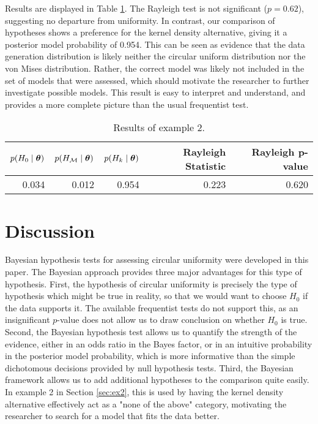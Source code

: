 Results are displayed in Table \ref{tab:ex2}. The Rayleigh test is not significant (\( p = 0.62\)), suggesting no departure from uniformity. In contrast, our comparison of hypotheses shows a preference for the kernel density alternative, giving it a posterior model probability of 0.954. This can be seen as evidence that the data generation distribution is likely neither the circular uniform distribution nor the von Mises distribution. Rather, the correct model was likely not included in the set of models that were assessed, which should motivate the researcher to further investigate possible models. This result is easy to interpret and understand, and provides a more complete picture than the usual frequentist test.


\begin{table}[btp]
\centering
\caption{Results of example 2. } 
\label{tab:ex2}
\begin{tabular}{rrrrr}
  \hline
$p(H_0 \mid \boldsymbol{\theta})$ & $p(H_\mathcal{M}  \mid \boldsymbol{\theta})$ & $p(H_k \mid \boldsymbol{\theta})$ & Rayleigh Statistic & Rayleigh  p-value \\ 
  \hline
0.034 & 0.012 & 0.954 & 0.223 & 0.620 \\ 
   \hline
\end{tabular}
\end{table}



\section{Discussion} \label{sec:discussion}

Bayesian hypothesis tests for assessing circular uniformity were developed in this paper. The Bayesian approach provides three major advantages for this type of hypothesis. First, the hypothesis of circular uniformity is precisely the type of hypothesis which might be true in reality, so that we would want to choose \( H_0 \) if the data supports it. The available frequentist tests do not support this, as an insignificant \(p\)-value does not allow us to draw conclusion on whether \(H_0\) is true. Second, the Bayesian hypothesis test allows us to quantify the strength of the evidence, either in an odds ratio in the Bayes factor, or in an intuitive probability in the posterior model probability, which is more informative than the simple dichotomous decisions provided by null hypothesis tests. Third, the Bayesian framework allows us to add additional hypotheses to the comparison quite easily. In example 2 in Section \ref{sec:ex2}, this is used by having the kernel density alternative effectively act as a "none of the above" category, motivating the researcher to search for a model that fits the data better.

